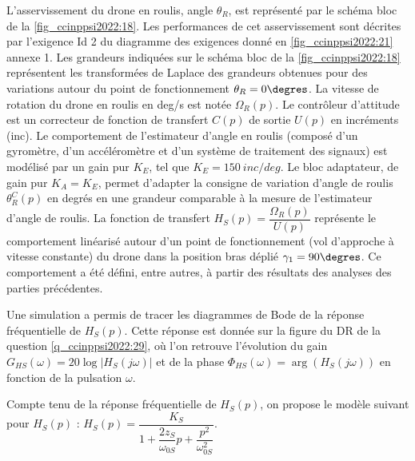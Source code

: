 L’asservissement du drone en roulis, angle $\theta_R$, est représenté par le schéma bloc de la
\autoref{fig_ccinppsi2022:18}. Les performances de cet asservissement sont décrites par l’exigence Id 2 du
diagramme des exigences donné en \autoref{fig_ccinppsi2022:21} annexe 1. Les grandeurs indiquées sur le
schéma bloc de la \autoref{fig_ccinppsi2022:18} représentent les transformées de Laplace des grandeurs obtenues pour des variations autour du point de fonctionnement $\theta_R = 0\degres$. La vitesse de rotation du
drone en roulis en \si{deg/s} est notée $\Omega_R(p)$. Le contrôleur d’attitude est un correcteur de fonction de transfert $C(p)$ de sortie $U(p)$ en incréments (inc). Le comportement de l’estimateur
d’angle en roulis (composé d’un gyromètre, d’un accéléromètre et d’un système de traitement des signaux) est modélisé par un gain pur $K_E$, tel que $K_E = \SI{150}{inc/deg}$.
Le bloc adaptateur, de gain pur $K_A = K_E$, permet d’adapter la consigne de variation d’angle
de roulis $\theta_R^C(p)$ en degrés en une grandeur comparable à la mesure de l’estimateur d’angle
de roulis.
La fonction de transfert $H_S (p) = \dfrac{\Omega_R(p)}{U(p)}$ représente le comportement linéarisé autour d’un
point de fonctionnement (vol d’approche à vitesse constante) du drone dans la position bras
déplié $\gamma_1 = 90\degres$. Ce comportement a été défini, entre autres, à partir des résultats des analyses des parties précédentes.


Une simulation a permis de tracer les diagrammes de Bode de la réponse fréquentielle de
$H_S (p)$. Cette réponse est donnée sur la figure du DR de la question \ref{q_ccinppsi2022:29}, où l’on retrouve l’évolution du
gain $G_{HS}(\omega) = 20 \log |H_S (j\omega)|$ et de la phase $\Phi_{HS} (\omega) = \arg\left(H_S (j\omega)\right)$ en fonction de la pulsation $\omega$.

Compte tenu de la réponse fréquentielle de $H_S (p)$, on propose le modèle suivant pour $H_S (p)$ :
$H_S(p)=\dfrac{K_S}{1+\dfrac{2z_S}{\omega_{0S}}p+\dfrac{p^2}{\omega_{0S}^2}}$.
\fi

